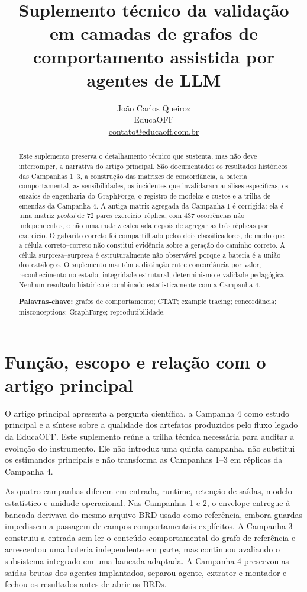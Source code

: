 \documentclass[11pt,a4paper]{article}
\title{\bfseries Suplemento técnico da validação em camadas de grafos de comportamento assistida por agentes de LLM}
\author{João Carlos Queiroz\\\small EducaOFF\\\small \href{mailto:contato@educaoff.com.br}{contato@educaoff.com.br}}
\date{}
\begin{document}
\maketitle

\begin{abstract}
Este suplemento preserva o detalhamento técnico que sustenta, mas não deve interromper, a narrativa do artigo principal. São documentados os resultados históricos das Campanhas 1--3, a construção das matrizes de concordância, a bateria comportamental, as sensibilidades, os incidentes que invalidaram análises específicas, os ensaios de engenharia do GraphForge, o registro de modelos e custos e a trilha de emendas da Campanha 4. A antiga matriz agregada da Campanha 1 é corrigida: ela é uma matriz \emph{pooled} de 72 pares exercício--réplica, com 437 ocorrências não independentes, e não uma matriz calculada depois de agregar as três réplicas por exercício. O gabarito correto foi compartilhado pelos dois classificadores, de modo que a célula correto--correto não constitui evidência sobre a geração do caminho correto. A célula surpresa--surpresa é estruturalmente não observável porque a bateria é a união dos catálogos. O suplemento mantém a distinção entre concordância por valor, reconhecimento no estado, integridade estrutural, determinismo e validade pedagógica. Nenhum resultado histórico é combinado estatisticamente com a Campanha 4.

\smallskip\noindent\textbf{Palavras-chave:} grafos de comportamento; CTAT; example tracing; concordância; misconceptions; GraphForge; reprodutibilidade.
\end{abstract}

\section{Função, escopo e relação com o artigo principal}

O artigo principal apresenta a pergunta científica, a Campanha 4 como estudo principal e a síntese sobre a qualidade dos artefatos produzidos pelo fluxo legado da EducaOFF. Este suplemento reúne a trilha técnica necessária para auditar a evolução do instrumento. Ele não introduz uma quinta campanha, não substitui os estimandos principais e não transforma as Campanhas 1--3 em réplicas da Campanha 4.

As quatro campanhas diferem em entrada, runtime, retenção de saídas, modelo estatístico e unidade operacional. Nas Campanhas 1 e 2, o envelope entregue à bancada derivava do mesmo arquivo BRD usado como referência, embora guardas impedissem a passagem de campos comportamentais explícitos. A Campanha 3 construiu a entrada sem ler o conteúdo comportamental do grafo de referência e acrescentou uma bateria independente em parte, mas continuou avaliando o subsistema integrado em uma bancada adaptada. A Campanha 4 preservou as saídas brutas dos agentes implantados, separou agente, extrator e montador e fechou os resultados antes de abrir os BRDs.
\end{document}
